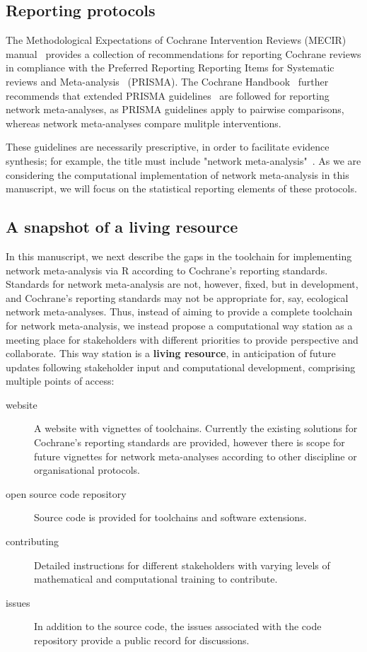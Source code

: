 \documentclass[12pt]{article}\usepackage[]{graphicx}\usepackage[]{color}
\begin{document}
\subsection{Reporting protocols}

The Methodological Expectations of Cochrane Intervention Reviews (MECIR) manual~\cite{higgins_methodological_2016} provides a collection of recommendations for reporting Cochrane reviews in compliance with the Preferred Reporting Reporting Items for Systematic reviews and Meta-analysis~\cite{liberati_prisma_2009} (PRISMA). The Cochrane Handbook~\cite{higgins2019cochrane} further recommends that extended PRISMA guidelines~\cite{hutton_prisma_2015} are followed for reporting network meta-analyses, as PRISMA guidelines apply to pairwise comparisons, whereas network meta-analyses compare mulitple interventions.

These guidelines are necessarily prescriptive, in order to facilitate evidence synthesis; for example, the title must include "network meta-analysis"~\cite{hutton_prisma_2015}. As we are considering the computational implementation of network meta-analysis in this manuscript, we will focus on the statistical reporting elements of these protocols.


\subsection{A snapshot of a living resource}

In this manuscript, we next describe the gaps in the toolchain for implementing network meta-analysis via R according to Cochrane's reporting standards. Standards for network meta-analysis are not, however, fixed, but in development, and Cochrane's reporting standards may not be appropriate for, say, ecological network meta-analyses. Thus, instead of aiming to provide a complete toolchain for network meta-analysis, we instead propose a computational way station as a meeting place for stakeholders with different priorities to provide perspective and collaborate. This way station is a \textbf{living resource}, in anticipation of future updates following stakeholder input and computational development, comprising multiple points of access:

\begin{description}
\item[website] A website with vignettes of toolchains. Currently the existing solutions for Cochrane's reporting standards are provided, however there is scope for future vignettes for network meta-analyses according to other discipline or organisational protocols.
\item[open source code repository] Source code is provided for toolchains and software extensions.
\item[contributing] Detailed instructions for different stakeholders with varying levels of mathematical and computational training to contribute.
\item[issues] In addition to the source code, the issues associated with the code repository provide a public record for discussions.
\end{description}
\end{document}
